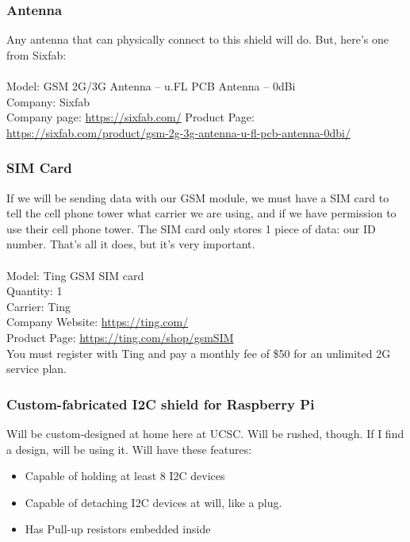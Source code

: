 \subsubsection{Antenna}
Any antenna that can physically connect to this shield will do. But, here’s one from Sixfab:\\
 \\
Model: GSM 2G/3G Antenna – u.FL PCB Antenna – 0dBi\\
Company: Sixfab\\
Company page: \href{https://sixfab.com/}{https://sixfab.com/}
Product Page: \href{https://sixfab.com/product/gsm-2g-3g-antenna-u-fl-pcb-antenna-0dbi/}{https://sixfab.com/product/gsm-2g-3g-antenna-u-fl-pcb-antenna-0dbi/}

\subsubsection{SIM Card}
If we will be sending data with our GSM module, we must have a SIM card to tell the cell phone tower what carrier we are using, and if we have permission to use their cell phone tower. The SIM card only stores 1 piece of data: our ID number. That’s all it does, but it’s very important.\\
 \\
Model: Ting GSM SIM card \\
Quantity: 1 \\
Carrier: Ting \\
Company Website: \href{https://ting.com/}{https://ting.com/} \\
Product Page:  \href{https://ting.com/shop/gsmSIM}{https://ting.com/shop/gsmSIM} \\

You must register with Ting and pay a monthly fee of \$50 for an unlimited 2G service plan.

\subsubsection{Custom-fabricated I2C shield for Raspberry Pi}

Will be custom-designed at home here at UCSC. Will be rushed, though. If I find a design, will be using it. Will have these features:
\begin{itemize}
	\item Capable of holding at least 8 I2C devices
	\item Capable of detaching I2C devices at will, like a plug.
	\item Has Pull-up resistors embedded inside
\end{itemize}

